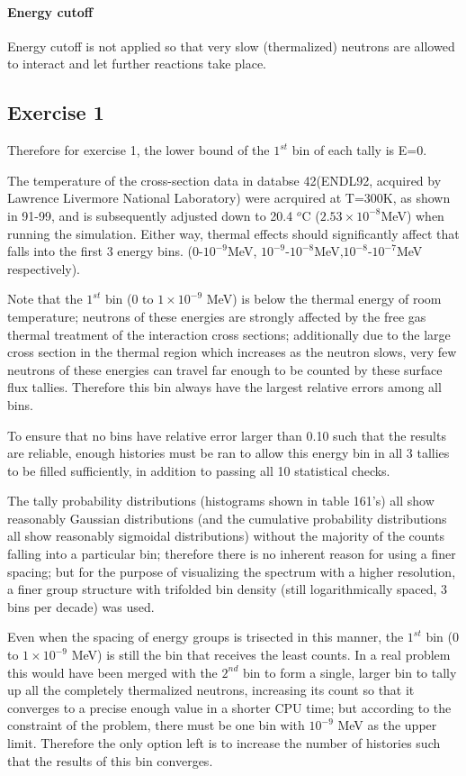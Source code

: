 \documentclass[a4paper, 12pt]{article}
\begin{document}
\paragraph{Energy cutoff}
Energy cutoff is not applied so that very slow (thermalized) neutrons are allowed to interact and let further reactions take place.

\subsection{Exercise 1}
Therefore for exercise 1, the lower bound of the $1^{st}$ bin of each tally is E=0.

The temperature of the cross-section data in databse 42(ENDL92, acquired by Lawrence Livermore National Laboratory) were acrquired at T=300K, as shown in 91-99, and is subsequently adjusted down to 20.4 ${}^{o}$C ($2.53 \times 10^{-8}$MeV) when running the simulation. Either way, thermal effects should significantly affect that falls into the first 3 energy bins. ($0$-$10^{-9}$MeV, $10^{-9}$-$10^{-8}$MeV,$10^{-8}$-$10^{-7}$MeV respectively).

Note that the $1^{st}$ bin ($0$ to $1\times 10^{-9}$ MeV) is below the thermal energy of room temperature; neutrons of these energies are strongly affected by the free gas thermal treatment of the interaction cross sections; additionally due to the large cross section in the thermal region which increases as the neutron slows, very few neutrons of these energies can travel far enough to be counted by these surface flux tallies. Therefore this bin always have the largest relative errors among all bins.

To ensure that no bins have relative error larger than 0.10 such that the results are reliable, enough histories must be ran to allow this energy bin in all 3 tallies to be filled sufficiently, in addition to passing all 10 statistical checks.

The tally probability distributions (histograms shown in table 161's) all show reasonably Gaussian distributions (and the cumulative probability distributions all show reasonably sigmoidal distributions) without the majority of the counts falling into a particular bin; therefore there is no inherent reason for using a finer spacing; but for the purpose of visualizing the spectrum with a higher resolution, a finer group structure with trifolded bin density (still logarithmically spaced, 3 bins per decade) was used.

Even when the spacing of energy groups is trisected in this manner, the $1^{st}$ bin ($0$ to $1\times 10^{-9}$ MeV) is still the bin that receives the least counts. In a real problem this would have been merged with the $2^{nd}$ bin to form a single, larger bin to tally up all the completely thermalized neutrons, increasing its count so that it converges to a precise enough value in a shorter CPU time; but according to the constraint of the problem, there must be one bin with ${10^{-9}}$ MeV as the upper limit. Therefore the only option left is to increase the number of histories such that the results of this bin converges.
\end{document}
